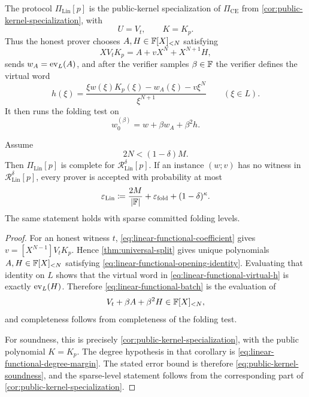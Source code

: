 \begin{definition}
\label{def:public-linear-functional-protocol}
The protocol \(\Pi_{\mathrm{Lin}}[p]\) is the public-kernel specialization of \(\Pi_{\mathrm{CE}}\) from \cref{cor:public-kernel-specialization}, with
\[
  U=V_t,
  \qquad
  K=K_p.
\]
Thus the honest prover chooses \(A,H\in\mathbb{F}[X]_{<N}\) satisfying
\begin{equation}
  XV_tK_p=A+vX^N+X^{N+1}H,
  \label{eq:linear-functional-opening-identity}
\end{equation}
sends \(w_A=\operatorname{ev}_L(A)\), and after the verifier samples \(\beta\in\mathbb{F}\) the verifier defines the virtual word
\begin{equation}
  h(\xi)
  =\frac{\xi w(\xi)K_p(\xi)-w_A(\xi)-v\xi^N}{\xi^{N+1}}
  \qquad(\xi\in L).
  \label{eq:linear-functional-virtual-h}
\end{equation}
It then runs the folding test on
\begin{equation}
  w_0^{(\beta)}=w+\beta w_A+\beta^2h.
  \label{eq:linear-functional-batch}
\end{equation}
\end{definition}

\begin{theorem}
\label{thm:public-linear-functional-protocol}
Assume
\begin{equation}
  2N<(1-\delta)M.
  \label{eq:linear-functional-degree-margin}
\end{equation}
Then \(\Pi_{\mathrm{Lin}}[p]\) is complete for \(\mathcal R^{\delta}_{\mathrm{Lin}}[p]\).  If an instance \((w;v)\) has no witness in \(\mathcal R^{\delta}_{\mathrm{Lin}}[p]\), every prover is accepted with probability at most
\begin{equation}
  \varepsilon_{\mathrm{Lin}}
  \coloneqq
  \frac{2M}{|\mathbb{F}|}
  +\varepsilon_{\mathrm{fold}}
  +(1-\delta)^\kappa.
  \label{eq:linear-functional-soundness}
\end{equation}
The same statement holds with sparse committed folding levels.
\end{theorem}

\begin{proof}
For an honest witness \(t\), \eqref{eq:linear-functional-coefficient} gives
\(
  v=[X^{N-1}]V_tK_p
\).
Hence \cref{thm:universal-split} gives unique polynomials \(A,H\in\mathbb{F}[X]_{<N}\) satisfying \eqref{eq:linear-functional-opening-identity}.  Evaluating that identity on \(L\) shows that the virtual word in \eqref{eq:linear-functional-virtual-h} is exactly \(\operatorname{ev}_L(H)\).  Therefore \eqref{eq:linear-functional-batch} is the evaluation of
\[
  V_t+\beta A+\beta^2H\in\mathbb{F}[X]_{<N},
\]
and completeness follows from completeness of the folding test.

For soundness, this is precisely \cref{cor:public-kernel-specialization}, with the public polynomial \(K=K_p\).  The degree hypothesis in that corollary is \eqref{eq:linear-functional-degree-margin}.  The stated error bound is therefore \eqref{eq:public-kernel-soundness}, and the sparse-level statement follows from the corresponding part of \cref{cor:public-kernel-specialization}.
\end{proof}

